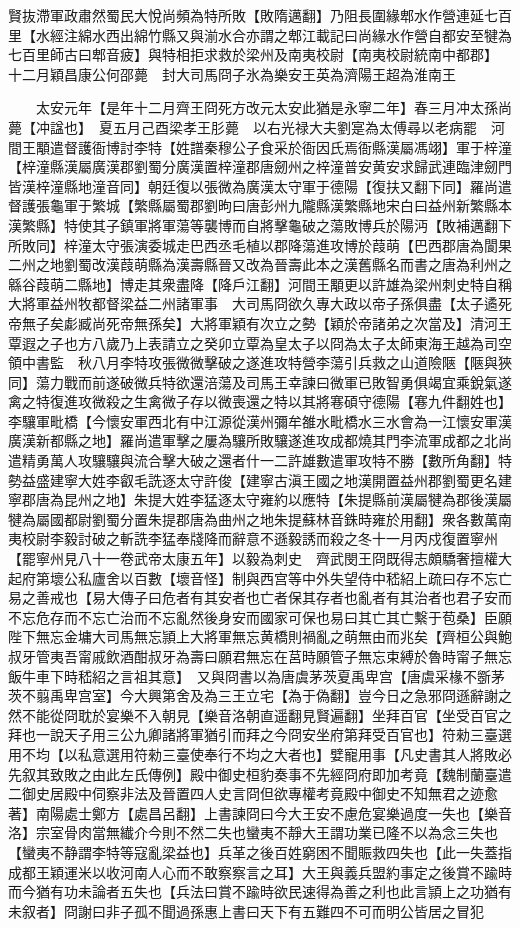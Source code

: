 賢抜滯軍政肅然蜀民大悅尚頻為特所敗【敗隋邁翻】乃阻長圍緣郫水作營連延七百里【水經注綿水西出綿竹縣又與湔水合亦謂之郫江載記曰尚緣水作營自都安至犍為七百里師古曰郫音疲】與特相拒求救於梁州及南夷校尉【南夷校尉統南中都郡】　十二月穎昌康公何邵薨　封大司馬冏子氷為樂安王英為濟陽王超為淮南王

　　太安元年【是年十二月齊王冏死方改元太安此猶是永寧二年】春三月冲太孫尚薨【冲諡也】　夏五月己酉梁孝王肜薨　以右光禄大夫劉寔為太傅尋以老病罷　河間王顒遣督護衙博討李特【姓譜秦穆公子食采於衙因氏焉衙縣漢屬馮翊】軍于梓潼【梓潼縣漢屬廣漢郡劉蜀分廣漢置梓潼郡唐劒州之梓潼普安黄安求歸武連臨津劒門皆漢梓潼縣地潼音同】朝廷復以張微為廣漢太守軍于德陽【復扶又翻下同】羅尚遣督護張龜軍于繁城【繁縣屬蜀郡劉昫曰唐彭州九隴縣漢繁縣地宋白曰益州新繁縣本漢繁縣】特使其子鎮軍將軍蕩等襲博而自將擊龜破之蕩敗博兵於陽沔【敗補邁翻下所敗同】梓潼太守張演委城走巴西丞毛植以郡降蕩進攻博於葭萌【巴西郡唐為閬果二州之地劉蜀改漢葭萌縣為漢壽縣晉又改為晉壽此本之漢舊縣名而書之唐為利州之緜谷葭萌二縣地】博走其衆盡降【降戶江翻】河間王顒更以許雄為梁州刺史特自稱大將軍益州牧都督梁益二州諸軍事　大司馬冏欲久專大政以帝子孫俱盡【太子遹死帝無子矣虨臧尚死帝無孫矣】大將軍穎有次立之勢【穎於帝諸弟之次當及】清河王覃遐之子也方八歲乃上表請立之癸卯立覃為皇太子以冏為太子太師東海王越為司空領中書監　秋八月李特攻張微微擊破之遂進攻特營李蕩引兵救之山道險陿【陿與狹同】蕩力戰而前遂破微兵特欲還涪蕩及司馬王幸諫曰微軍已敗智勇俱竭宜乘銳氣遂禽之特復進攻微殺之生禽微子存以微喪還之特以其將寋碩守德陽【寋九件翻姓也】李驤軍毗橋【今懷安軍西北有中江源從漢州彌牟雒水毗橋水三水會為一江懷安軍漢廣漢新都縣之地】羅尚遣軍擊之屢為驤所敗驤遂進攻成都燒其門李流軍成都之北尚遣精勇萬人攻驤驤與流合擊大破之還者什一二許雄數遣軍攻特不勝【數所角翻】特勢益盛建寧大姓李叡毛詵逐太守許俊【建寧古滇王國之地漢開置益州郡劉蜀更名建寧郡唐為昆州之地】朱提大姓李猛逐太守雍約以應特【朱提縣前漢屬犍為郡後漢屬犍為屬國都尉劉蜀分置朱提郡唐為曲州之地朱提蘇林音銖時雍於用翻】衆各數萬南夷校尉李毅討破之斬詵李猛奉牋降而辭意不遜毅誘而殺之冬十一月丙戍復置寧州【罷寧州見八十一卷武帝太康五年】以毅為刺史　齊武閔王冏既得志頗驕奢擅權大起府第壞公私廬舍以百數【壞音怪】制與西宫等中外失望侍中嵇紹上疏曰存不忘亡易之善戒也【易大傳子曰危者有其安者也亡者保其存者也亂者有其治者也君子安而不忘危存而不忘亡治而不忘亂然後身安而國家可保也易曰其亡其亡繫于苞桑】臣願陛下無忘金墉大司馬無忘頴上大將軍無忘黄橋則禍亂之萌無由而兆矣【齊桓公與鮑叔牙管夷吾甯戚飲酒酣叔牙為壽曰願君無忘在莒時願管子無忘束縛於魯時甯子無忘飯牛車下時嵇紹之言祖其意】　又與冏書以為唐虞茅茨夏禹卑宫【唐虞采椽不斵茅茨不翦禹卑宫室】今大興第舍及為三王立宅【為于偽翻】豈今日之急邪冏遜辭謝之然不能從冏耽於宴樂不入朝見【樂音洛朝直遥翻見賢遍翻】坐拜百官【坐受百官之拜也一說天子用三公九卿諸將軍猶引而拜之今冏安坐府第拜受百官也】符勑三臺選用不均【以私意選用符勑三臺使奉行不均之大者也】嬖寵用事【凡史書其人將敗必先叙其致敗之由此左氏傳例】殿中御史桓豹奏事不先經冏府即加考竟【魏制蘭臺遣二御史居殿中伺察非法及晉置四人史言冏但欲專權考竟殿中御史不知無君之迹愈著】南陽處士鄭方【處昌呂翻】上書諫冏曰今大王安不慮危宴樂過度一失也【樂音洛】宗室骨肉當無纎介今則不然二失也蠻夷不靜大王謂功業已隆不以為念三失也【蠻夷不静謂李特等寇亂梁益也】兵革之後百姓窮困不聞賑救四失也【此一失蓋指成都王穎運米以收河南人心而不敢察察言之耳】大王與義兵盟約事定之後賞不踰時而今猶有功未論者五失也【兵法曰賞不踰時欲民速得為善之利也此言頴上之功猶有未叙者】冏謝曰非子孤不聞過孫惠上書曰天下有五難四不可而明公皆居之冒犯
